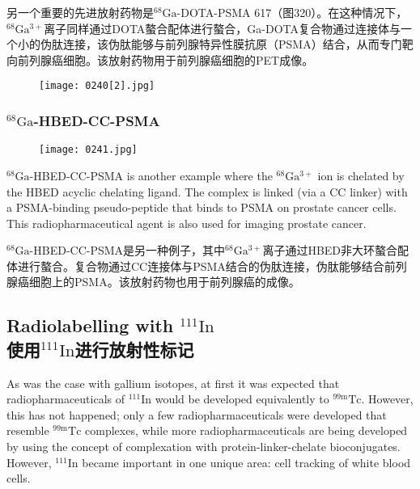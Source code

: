 \documentclass[dvipsnames, svgnames,a4paper,11pt]{article}
\begin{document}
另一个重要的先进放射药物是\(\mathrm{^{68}Ga}\)-DOTA-PSMA 617（图320）。在这种情况下，\(\mathrm{^{68}Ga^{3+}}\)离子同样通过DOTA螯合配体进行螯合，Ga-DOTA复合物通过连接体与一个小的伪肽连接，该伪肽能够与前列腺特异性膜抗原（PSMA）结合，从而专门靶向前列腺癌细胞。该放射药物用于前列腺癌细胞的PET成像。

\begin{figure}[h]
	\centering
    \texttt{[image: 0240[2].jpg]}  
     \label{fig320}
\end{figure}

\subsubsection{\(\mathrm{^{68}Ga}\)-HBED-CC-PSMA}  

\begin{figure}[h]
	\centering
    \texttt{[image: 0241.jpg]}  
     \label{fig321}
\end{figure}

\(\mathrm{^{68}Ga}\)-HBED-CC-PSMA is another example where the \(\mathrm{^{68}Ga^{3+}}\) ion is chelated by the HBED acyclic chelating ligand. The complex is linked (via a CC linker) with a PSMA-binding pseudo-peptide that binds to PSMA on prostate cancer cells. This radiopharmaceutical agent is also used for imaging prostate cancer.

\(\mathrm{^{68}Ga}\)-HBED-CC-PSMA是另一种例子，其中\(\mathrm{^{68}Ga^{3+}}\)离子通过HBED非大环螯合配体进行螯合。复合物通过CC连接体与PSMA结合的伪肽连接，伪肽能够结合前列腺癌细胞上的PSMA。该放射药物也用于前列腺癌的成像。

\subsection{Radiolabelling with \(\mathrm{^{111}In}\)\\ 使用\(\mathrm{^{111}In}\)进行放射性标记}  

As was the case with gallium isotopes, at first it was expected that radiopharmaceuticals of \(\mathrm{^{111}In}\) would be developed equivalently to \(\mathrm{^{99m}Tc}\). However, this has not happened; only a few radiopharmaceuticals were developed that resemble \(\mathrm{^{99m}Tc}\) complexes, while more radiopharmaceuticals are being developed by using the concept of complexation with protein-linker-chelate bioconjugates. However, \(\mathrm{^{111}In}\) became important in one unique area: cell tracking of white blood cells.
\end{document}
